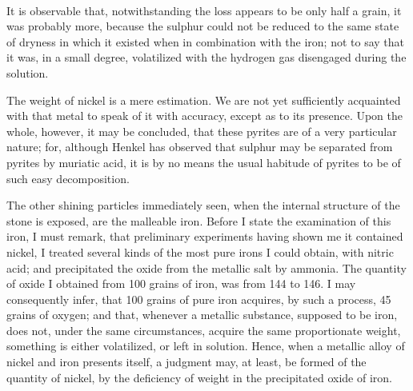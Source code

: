 \documentclass[a4paper, 12pt, oneside]{article}
\begin{document}
\paragraph{}
It is observable that, notwithstanding the loss appears to be only half a grain, it was probably more, because the sulphur could not be reduced to the same state of dryness in which it existed when in combination with the iron; not to say that it was, in a small degree, volatilized with the hydrogen gas disengaged during the solution.

The weight of nickel is a mere estimation. We are not yet sufficiently acquainted with that metal to speak of it with accuracy, except as to its presence. Upon the whole, however, it may be concluded, that these pyrites are of a very particular nature; for, although Henkel has observed that sulphur may be separated from pyrites by muriatic acid, it is by no means the usual habitude of pyrites to be of such easy decomposition.

The other shining particles immediately seen, when the internal structure of the stone is exposed, are the malleable iron. Before I state the examination of this iron, I must remark, that preliminary experiments having shown me it contained nickel, I treated several kinds of the most pure irons I could obtain, with nitric acid; and precipitated the oxide from the metallic salt by ammonia. The quantity of oxide I obtained from 100 grains of iron, was from 144 to 146. I may consequently infer, that 100 grains of pure iron acquires, by such a process, 45 grains of oxygen; and that, whenever a metallic substance, supposed to be iron, does not, under the same circumstances, acquire the same proportionate weight, something is either volatilized, or left in solution. Hence, when a metallic alloy of nickel and iron presents itself, a judgment may, at least, be formed of the quantity of nickel, by the deficiency of weight in the precipitated oxide of iron.
\end{document}
